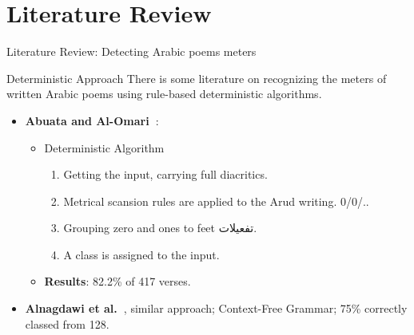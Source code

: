 \section{Literature Review}

\begin{frame}[fragile]{Literature Review: Detecting Arabic poems meters}

\begin{block}{Deterministic Approach}
	There is some literature on recognizing the meters of written Arabic poems using rule-based deterministic algorithms.
\end{block}

\begin{itemize}
	\item <1-> [--] \textbf{Abuata and Al-Omari~\cite{Abuata2016RuleBasedAlgorithm}}:
	\begin{itemize}
		\item<2-> Deterministic Algorithm
		\begin{enumerate}
			\item Getting the input, carrying full diacritics.
			\item Metrical scansion rules are applied to the Arud writing. 0/0/..
			\item Grouping zero and ones to feet \textarabic{تفعيلات}.
			\item A class is assigned  to the input.
		\end{enumerate}
		\item<3-> \textbf{\alert{Results}}: 82.2\% of 417 verses.
	\end{itemize}
	\item <4->[--]\textbf{Alnagdawi et al.~\cite{Alnagdawi2013FindingArabicPoemMeter}}, similar approach;  Context-Free Grammar; 75\% correctly
	classed from 128.
\end{itemize}


\end{frame}

